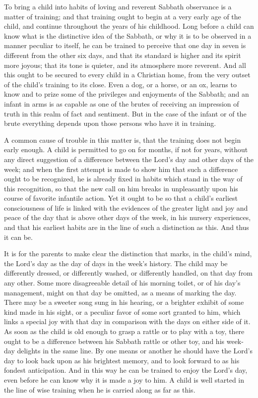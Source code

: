 \documentclass[
]{book}
\begin{document}
To bring a child into habits of loving and reverent Sabbath observance is a matter of training; and that training ought to begin at a very early age of the child, and continue throughout the years of his childhood. Long before a child can know what is the distinctive idea of the Sabbath, or why it is to be observed in a manner peculiar to itself, he can be trained to perceive that one day in seven is different from the other six days, and that its standard is higher and its spirit more joyous; that its tone is quieter, and its atmosphere more reverent. And all this ought to be secured to every child in a Christian home, from the very outset of the child's training to its close. Even a dog, or a horse, or an ox, learns to know and to prize some of the privileges and enjoyments of the Sabbath; and an infant in arms is as capable as one of the brutes of receiving an impression of truth in this realm of fact and sentiment. But in the case of the infant or of the brute everything depends upon those persons who have it in training.

A common cause of trouble in this matter is, that the training does not begin early enough. A child is permitted to go on for months, if not for years, without any direct suggestion of a difference between the Lord's day and other days of the week; and when the first attempt is made to show him that such a difference ought to be recognized, he is already fixed in habits which stand in the way of this recognition, so that the new call on him breaks in unpleasantly upon his course of favorite infantile action. Yet it ought to be so that a child's earliest consciousness of life is linked with the evidences of the greater light and joy and peace of the day that is above other days of the week, in his nursery experiences, and that his earliest habits are in the line of such a distinction as this. And thus it can be.

It is for the parents to make clear the distinction that marks, in the child's mind, the Lord's day as the day of days in the week's history. The child may be differently dressed, or differently washed, or differently handled, on that day from any other. Some more disagreeable detail of his morning toilet, or of his day's management, might on that day be omitted, as a means of marking the day. There may be a sweeter song sung in his hearing, or a brighter exhibit of some kind made in his sight, or a peculiar favor of some sort granted to him, which links a special joy with that day in comparison with the days on either side of it. As soon as the child is old enough to grasp a rattle or to play with a toy, there ought to be a difference between his Sabbath rattle or other toy, and his week-day delights in the same line. By one means or another he should have the Lord's day to look back upon as his brightest memory, and to look forward to as his fondest anticipation. And in this way he can be trained to enjoy the Lord's day, even before he can know why it is made a joy to him. A child is well started in the line of wise training when he is carried along as far as this.
\end{document}
